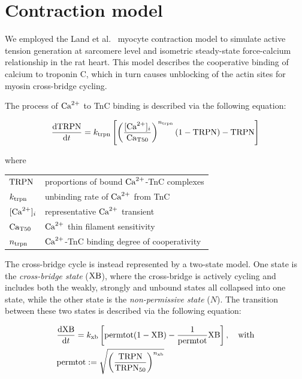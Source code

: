 %
%
%
\section{Contraction model}
We employed the Land et al.~\cite{Land:2012} myocyte contraction model to simulate active tension generation at sarcomere level and isometric steady-state force-calcium relationship in the rat heart. This model describes the cooperative binding of calcium to troponin C, which in turn causes unblocking of the actin sites for myosin cross-bridge cycling.

\vspace{0.2cm}
The process of $\textrm{Ca}^{2+}$ to TnC binding is described via the following equation:

\begin{equation}\label{eq:landodesys1}
    \dfrac{\mathrm{d}{\textrm{TRPN}}}{\mathrm{d}{t}} = k_{\textrm{trpn}}\left[\left(\frac{[\textrm{Ca}^{2+}]_{i}}{\textrm{Ca}_{\textrm{T}50}}\right)^{n_{\textrm{trpn}}}(1-\textrm{TRPN})-\textrm{TRPN}\right]
\end{equation}

\noindent
where

\vspace{0.2cm}
\begin{tabular}{ll}
    $\textrm{TRPN}$  & proportions of bound $\textrm{Ca}^{2+}$-TnC complexes \\
    $k_{\textrm{trpn}}$ & unbinding rate of $\textrm{Ca}^{2+}$ from TnC \\
    $[\textrm{Ca}^{2+}]_{i}$   & representative $\textrm{Ca}^{2+}$ transient \\
    $\textrm{Ca}_{\textrm{T}50}$ & $\textrm{Ca}^{2+}$ thin filament sensitivity \\
    $n_{\textrm{trpn}}$ & $\textrm{Ca}^{2+}$-TnC binding degree of cooperativity
\end{tabular}

\vspace{0.3cm}
The cross-bridge cycle is instead represented by a two-state model. One state is the \textit{cross-bridge state} ($\textrm{XB}$), where the cross-bridge is actively cycling and includes both the weakly, strongly and unbound states all collapsed into one state, while the other state is the \textit{non-permissive state} ($N$). The transition between these two states is described via the following equation:

\begin{align}\label{eq:landodesys2}
    & \dfrac{\mathrm{d}{\textrm{XB}}}{\mathrm{d}{t}} = k_{\textrm{xb}}\left[\textrm{permtot}(1-\textrm{XB})-\frac{1}{\textrm{permtot}}\textrm{XB}\right],\quad\text{with} \\
    & \textrm{permtot} := \sqrt{\left(\frac{\textrm{TRPN}}{\textrm{TRPN}_{50}}\right)^{n_{\textrm{xb}}}} \nonumber
\end{align}

